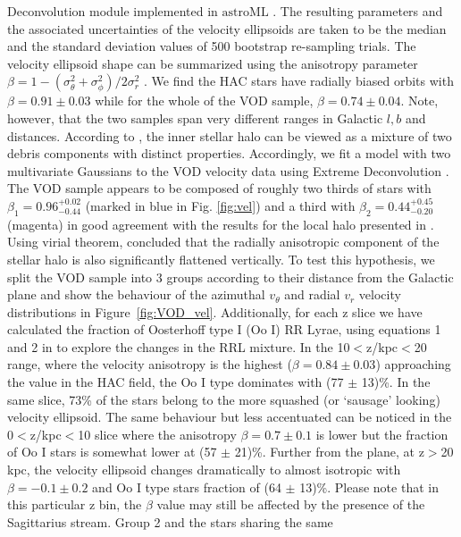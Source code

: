 \documentclass[fleqn,usenatbib]{mnras}
\begin{document}
Deconvolution module implemented in $\mathrm{astroML}$
\citep{astroML}. The resulting parameters and the associated
uncertainties of the velocity ellipsoids are taken to be the median
and the standard deviation values of 500 bootstrap re-sampling trials.
The velocity ellipsoid shape can be summarized using the anisotropy
parameter $\beta=1-(\sigma^2_{\theta}+\sigma^2_{\phi})/2\sigma^2_r$
\citep[see][]{Binney2008}. We find the HAC stars have radially biased
orbits with $\beta = 0.91 \pm 0.03$ while for the whole of the VOD
sample, $\beta = 0.74 \pm 0.04$. Note, however, that the two samples
span very different ranges in Galactic $l,b$ and distances. According
to \citet{Belokurov2018}, the inner stellar halo can be viewed as a
mixture of two debris components with distinct
properties. Accordingly, we fit a model with two multivariate
Gaussians to the VOD velocity data using Extreme Deconvolution
\citep[see][]{ED}. The VOD sample appears to be composed of roughly
two thirds of stars with $\beta_{1}= 0.96^{+0.02}_{-0.44}$ (marked in
blue in Fig. \ref{fig:vel}) and a third with
$\beta_{2}=0.44^{+0.45}_{-0.20}$ (magenta) in good agreement with the
results for the local halo presented in \citet{Belokurov2018}.
%
Using virial theorem, \citet{actionhalo} concluded that the radially
anisotropic component of the stellar halo is also significantly
flattened vertically. To test this hypothesis, we split the VOD sample
into 3 groups according to their distance from the Galactic plane and
show the behaviour of the azimuthal $v_{\theta}$ and radial $v_{r}$
velocity distributions in Figure~\ref{fig:VOD_vel}. Additionally, for
each z slice we have calculated the fraction of Oosterhoff type I (Oo
I) RR Lyrae, using equations 1 and 2 in \citet{Be2018} to explore the
changes in the RRL mixture. In the 10$<$z/kpc$<$20 range, where the
velocity anisotropy is the highest ($\beta = 0.84 \pm 0.03$)
approaching the value in the HAC field, the Oo I type dominates with 
(77 $\pm$ 13)\%. In the same slice, 73\% of the stars belong to the more
squashed (or `sausage' looking) velocity ellipsoid. The same behaviour
but less accentuated can be noticed in the 0$<$z/kpc$<$10 slice where
the anisotropy $\beta = 0.7 \pm 0.1$ is lower but the fraction of Oo I
stars is somewhat lower at (57 $\pm$ 21)\%. Further from the plane, at z$>$20
kpc, the velocity ellipsoid changes dramatically to almost isotropic
with $\beta = -0.1 \pm 0.2$ and Oo I type stars fraction of (64 $\pm$ 13)\%. Please note that in this particular z bin, the $\beta$ value may still be affected by the presence of the
Sagittarius stream. Group 2 and the stars sharing the same
\end{document}
